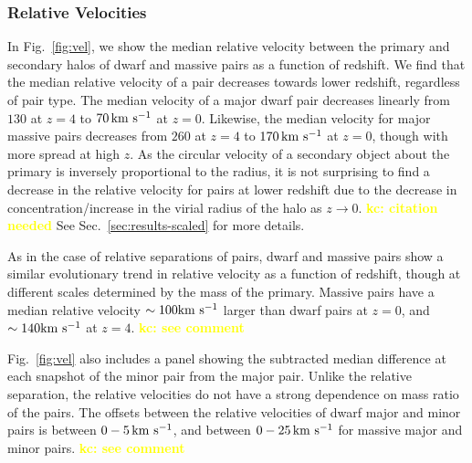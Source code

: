 \documentclass[twocolumn]{aastex631}
\newcommand{\kc}[1]{\textcolor{yellow}{\textbf{kc: #1}} }
\begin{document}
        \subsubsection{Relative Velocities}
        In Fig.~\ref{fig:vel}, we show the median relative velocity between the primary and secondary halos of dwarf and massive pairs as a function of redshift. 
        We find that the median relative velocity of a pair decreases towards lower redshift, regardless of pair type.
        The median velocity of a major dwarf pair decreases linearly from $130$ at $z=4$ to $70\,\mathrm{km}~\mathrm{s}^{-1}$ at $z=0$. Likewise, the median velocity for major massive pairs decreases from $260$ at $z=4$ to $170\,\mathrm{km}~\mathrm{s}^{-1}$ at $z=0$, though with more spread at high $z$.
        \todo{} As the circular velocity of a secondary object about the primary is inversely proportional to the radius, it is not surprising to find a decrease in the relative velocity for pairs at lower redshift due to the decrease in concentration/increase in the virial radius of the halo as $z\to0$. \kc{citation needed}
        See Sec.~\ref{sec:results-scaled} for more details.
        
        As in the case of relative separations of pairs, dwarf and massive pairs show a similar evolutionary trend in relative velocity as a function of redshift, though at different scales determined by the mass of the primary.
        Massive pairs have a median relative velocity $\sim100\mathrm{km}~\mathrm{s}^{-1}$ larger than dwarf pairs at $z=0$, and $\sim140\mathrm{km}~\mathrm{s}^{-1}$ at $z=4$. \kc{see comment}
    
        Fig.~\ref{fig:vel} also includes a panel showing the subtracted median difference at each snapshot of the minor pair from the major pair. Unlike the relative separation, the relative velocities do not have a strong dependence on mass ratio of the pairs. 
        The offsets between the relative velocities of dwarf major and minor pairs is between $0-5\,\mathrm{km}~\mathrm{s}^{-1}$, and between $0-25\,\mathrm{km}~\mathrm{s}^{-1}$ for massive major and minor pairs. \kc{see comment} %
        
\end{document}

